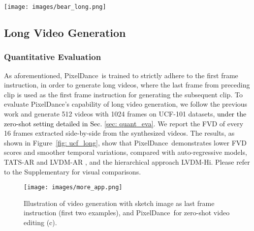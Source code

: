 \documentclass[10pt,twocolumn,letterpaper]{article}
\newcommand{\tcb}{\textcolor{black}}
\newcommand{\ours}{{PixelDance}}
\begin{document}
\begin{figure*}[t]
  \centering
  \texttt{[image: images/bear\_long.png]}
  \caption{
  Illustration of \ours~handling intricate shot compositions consisting of two continuous video clips, in which case the last frame of the Clip \#1 serves as the first frame instruction for Clip \#2.
  }
  \label{fig: bear_long}
\end{figure*}


\subsection{Long Video Generation}
\label{sec: exp_long}

\subsubsection{Quantitative Evaluation}
As aforementioned, \ours~is trained to strictly adhere to the first frame instruction, in order to generate long videos, where the last frame from preceding clip is used as the first frame instruction for generating the subsequent clip. To evaluate \ours's capability of long video generation, we follow the previous work \cite{ge2022TATS,he2022LVDM} and generate 512 videos with 1024 frames on UCF-101 datasets, \tcb{under the zero-shot setting detailed in Sec. \ref{sec: quant_eva}}. We report the FVD of every 16 frames extracted side-by-side from the synthesized videos. The results, as shown in Figure~\ref{fig: ucf_long}, show that \ours~demonstrates lower FVD scores and smoother temporal variations, compared with auto-regressive models, TATS-AR \cite{ge2022TATS} and LVDM-AR \cite{he2022LVDM}, and the hierarchical approach LVDM-Hi. Please refer to the Supplementary for visual comparisons.


\begin{figure}[t]
  \centering
  \texttt{[image: images/more\_app.png]}
  \caption{
  Illustration of video generation with sketch image as last frame instruction (first two examples), and \ours~for zero-shot video editing (c). 
  }
  \label{fig: more_app}
\end{figure}
\end{document}
